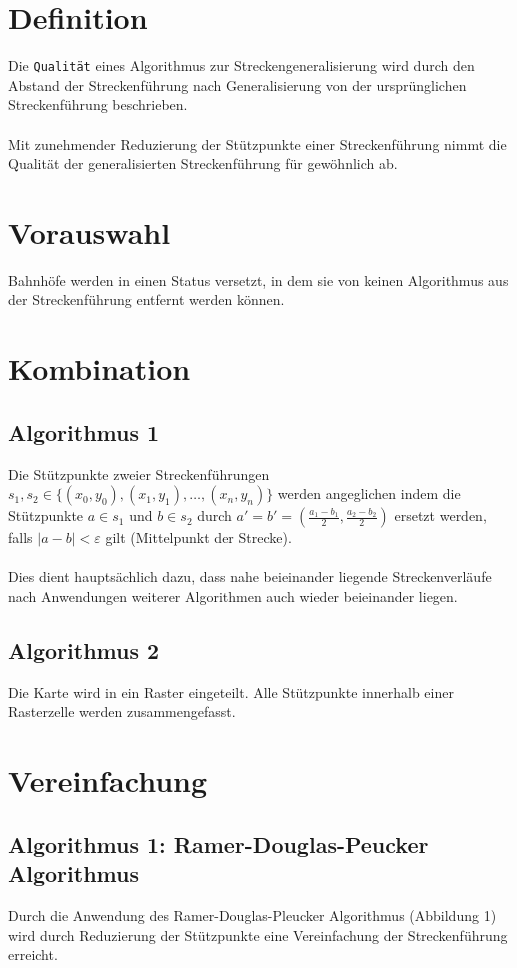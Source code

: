 \documentclass[twoside]{scrartcl}
\begin{document}
\section{Definition}
Die \texttt{Qualität} eines Algorithmus zur Streckengeneralisierung
wird durch den Abstand der Streckenführung nach Generalisierung von der
ursprünglichen Streckenführung beschrieben.\\\\
Mit zunehmender Reduzierung der Stützpunkte einer Streckenführung
nimmt die Qualität der generalisierten Streckenführung für
gewöhnlich ab.
\section{Vorauswahl}
Bahnhöfe werden in einen Status versetzt, in dem sie von keinen
Algorithmus aus der Streckenführung entfernt werden können.
\section{Kombination}
\subsection{Algorithmus 1}
Die Stützpunkte zweier Streckenführungen
$s_1, s_2 \in \{(x_0, y_0), (x_1, y_1), \ldots, (x_n, y_n)\}$
werden angeglichen indem die Stützpunkte
$a \in s_1$ und  $b \in s_2$
durch
$a' = b' = (\frac{a_1 - b_1}{2}, \frac{a_2 - b_2}{2})$ ersetzt werden,
falls
$|a - b| < \varepsilon$ gilt (Mittelpunkt der Strecke).\\
\\
Dies dient hauptsächlich dazu, dass nahe beieinander liegende
Streckenverläufe nach Anwendungen weiterer Algorithmen auch
wieder beieinander liegen.
\subsection{Algorithmus 2}
Die Karte wird in ein Raster eingeteilt. Alle Stützpunkte innerhalb einer
Rasterzelle werden zusammengefasst.
\section{Vereinfachung}
\subsection{Algorithmus 1: Ramer-Douglas-Peucker Algorithmus}
Durch die Anwendung des Ramer-Douglas-Pleucker Algorithmus
(Abbildung 1) 
wird durch Reduzierung der Stützpunkte eine Vereinfachung
der Streckenführung erreicht.\\
\end{document}
